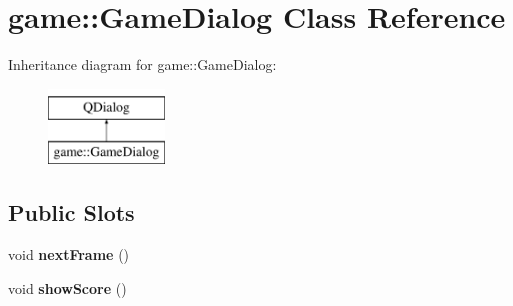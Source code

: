 \hypertarget{classgame_1_1GameDialog}{}\section{game\+:\+:Game\+Dialog Class Reference}
\label{classgame_1_1GameDialog}
Inheritance diagram for game\+:\+:Game\+Dialog\+:\begin{figure}[H]
\begin{center}
\leavevmode
\includegraphics[height=2.000000cm]{classgame_1_1GameDialog}
\end{center}
\end{figure}
\subsection*{Public Slots}
\begin{DoxyCompactItemize}
\item 
\mbox{\label{classgame_1_1GameDialog_a0358b408a3dea5eae10208f02b316abc}} 
void {\bfseries next\+Frame} ()
\item 
\mbox{\label{classgame_1_1GameDialog_ae7a5897afb7b192c1ee2346b0c523c85}} 
void {\bfseries show\+Score} ()
\end{DoxyCompactItemize}
